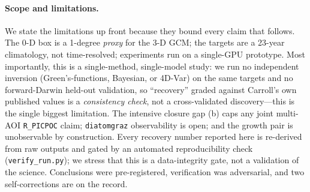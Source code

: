 \documentclass[11pt]{article}
\begin{document}
\paragraph{Scope and limitations.}
We state the limitations up front because they bound every claim that follows.
The 0-D box is a 1-degree \emph{proxy} for the 3-D GCM; the targets are a 23-year
climatology, not time-resolved; experiments run on a single-GPU prototype. Most
importantly, this is a single-method, single-model study: we run no independent
inversion (Green's-functions, Bayesian, or 4D-Var) on the same targets and no
forward-Darwin held-out validation, so ``recovery'' graded against Carroll's own
published values is a \emph{consistency check}, not a cross-validated discovery---this
is the single biggest limitation. The intensive closure gap (b) caps any joint
multi-AOI \texttt{R\_PICPOC} claim; \texttt{diatomgraz} observability is open; and
the growth pair is unobservable by construction. Every recovery number reported
here is re-derived from raw outputs and gated by an automated reproducibility
check (\texttt{verify\_run.py}); we stress that this is a data-integrity gate, not
a validation of the science. Conclusions were pre-registered, verification was
adversarial, and two self-corrections are on the record.
\end{document}
